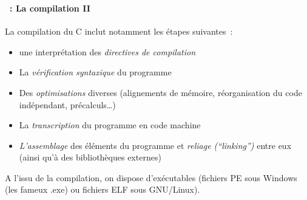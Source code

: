 \begin{frame}
  \frametitle{\secname}
  \framesubtitle{\subsecname~: La compilation II} 
  La compilation du C inclut notamment les étapes suivantes~:
  \begin{itemize}
    \item une interprétation des \emph{directives de compilation}
    \item La \emph{vérification syntaxique} du programme
    \item Des \emph{optimisations} diverses (alignements de mémoire, réorganisation du code indépendant, précalculs\ldots)
    \item La \emph{transcription} du programme en code machine
    \item \emph{L'assemblage} des éléments du programme et \emph{reliage (“linking”)} entre eux (ainsi qu'à des bibliothèques externes)
  \end{itemize}
  \vspace{0.5cm}
  A l'issu de la compilation, on dispose d'exécutables (fichiers PE sous Windows (les fameux .exe) ou fichiers ELF sous GNU/Linux).
\end{frame}


